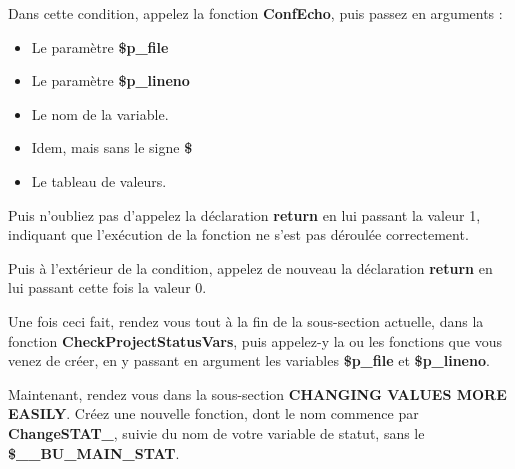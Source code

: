 \documentclass[a4paper,10pt]{article}
\begin{document}
\begin{justify}
    Dans cette condition, appelez la fonction \textbf{\color{mauve}ConfEcho}, puis passez en arguments :

    \begin{itemize}
        \item Le paramètre \textbf{\color{orange}\$p\_file}\\

        \item Le paramètre \textbf{\color{orange}\$p\_lineno}\\

        \item Le nom de la variable.\\

        \item Idem, mais sans le signe \textbf{\$}\\

        \item Le tableau de valeurs.
    \end{itemize}
\end{justify}

\begin{justify}
    Puis n'oubliez pas d'appelez la déclaration \textbf{\color{gray}return} en lui passant la valeur 1, indiquant que l'exécution de la fonction ne s'est pas déroulée correctement.
\end{justify}

\begin{justify}
    Puis à l'extérieur de la condition, appelez de nouveau la déclaration \textbf{\color{gray}return} en lui passant cette fois la valeur 0.
\end{justify}

\begin{justify}
    Une fois ceci fait, rendez vous tout à la fin de la sous-section actuelle, dans la fonction \textbf{\color{mauve}CheckProjectStatusVars}, puis appelez-y la ou les fonctions que vous venez de créer, en y passant en argument les variables \textbf{\color{orange}\$p\_file} et \textbf{\color{orange}\$p\_lineno}.\\[1\baselineskip]
\end{justify}


\begin{justify}
    Maintenant, rendez vous dans la sous-section \textbf{CHANGING VALUES MORE EASILY}. Créez une nouvelle fonction, dont le nom commence par \textbf{\color{mauve}ChangeSTAT\_}, suivie du nom de votre variable de statut, sans le \textbf{\color{orange}\$\_\_BU\_MAIN\_STAT}.
\end{justify}
\end{document}
